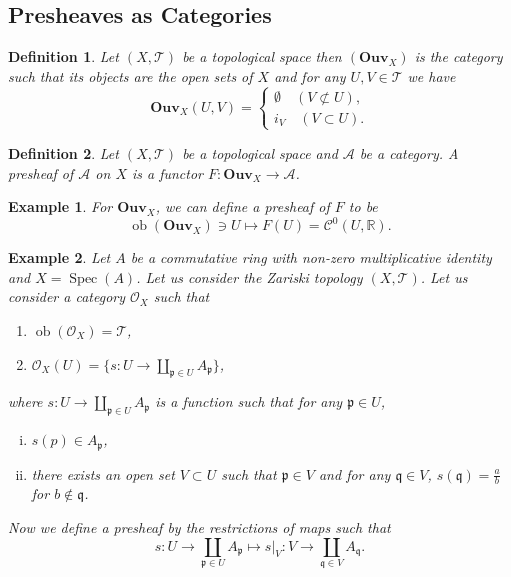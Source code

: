 \documentclass{article}
\newtheorem{definition}{Definition}[section]
\newtheorem{example}{Example}[section]
\numberwithin{equation}{section}
\DeclareMathOperator{\ob}{ob}
\DeclareMathOperator{\Spec}{Spec}
\begin{document}
\subsection{Presheaves as Categories}

\begin{definition}
Let $(X,\mathcal{T})$ be a topological space then $(\mathbf{Ouv}_X)$ is the category such that its objects are the open sets of $X$ and for any $U,V\in\mathcal{T}$ we have
\begin{equation*}
\mathbf{Ouv}_X(U,V)=
\begin{cases}
\emptyset \quad (V\not\subset U),\\
i_V \quad (V\subset U).
\end{cases}
\end{equation*}
\end{definition}

\begin{definition}
Let $(X,\mathcal{T})$ be a topological space and $\mathcal{A}$ be a category. A presheaf of $\mathcal{A}$ on $X$ is a functor $F:\mathbf{Ouv}_X\to\mathcal{A}$.
\end{definition}

\begin{example}
For $\mathbf{Ouv}_X$, we can define a presheaf of $F$ to be
\begin{equation*}
\ob(\mathbf{Ouv}_X)\ni U\mapsto F(U) = \mathcal{C}^0(U,\mathbb{R}).
\end{equation*}
\end{example}

\begin{example}
\label{structure_sheaf_ring}
Let $A$ be a commutative ring with non-zero multiplicative identity and $X=\Spec(A)$. Let us consider the Zariski topology $(X,\mathcal{T})$. Let us consider a category $\mathcal{O}_X$ such that
\begin{enumerate}[\textbullet]
\item $\ob(\mathcal{O}_X) = \mathcal{T}$,
\item $\mathcal{O}_X(U) =  \{s:U\to\coprod_{\mathfrak{p}\in U}A_{\mathfrak{p}}\}$,
\end{enumerate}
where $s:U\to\coprod_{\mathfrak{p}\in U}A_{\mathfrak{p}}$ is a function such that for any $\mathfrak{p}\in U$,
\begin{enumerate}[i).]
\item $s(p)\in A_{\mathfrak{p}}$,
\item there exists an open set $V\subset U$ such that $\mathfrak{p}\in V$ and for any $\mathfrak{q}\in V$,  $s(\mathfrak{q})={\frac a b}$ for $b\not\in\mathfrak{q}$. 
\end{enumerate}
Now we define a presheaf by the restrictions of maps such that
\begin{equation*}
s:U\to\coprod_{\mathfrak{p}\in U}A_{\mathfrak{p}} \mapsto s|_V:V\to\coprod_{\mathfrak{q}\in V} A_{\mathfrak{q}}.
\end{equation*}
\end{example}
\end{document}
